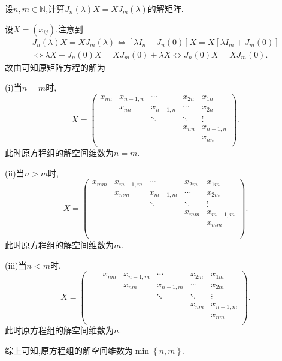 \documentclass[../../main.tex]{subfiles}
\begin{document}
\begin{corollary}\label{corollary:与Jordan块J_n(lambda)可交换的矩阵}
设$n,m\in\mathbb{N}$,计算$J_n(\lambda)X = XJ_m(\lambda)$的解矩阵. 
\end{corollary}
\begin{solution}
设$X=(x_{ij})$,注意到
\begin{gather*}
J_n\left( \lambda \right) X=XJ_m\left( \lambda \right) \Longleftrightarrow \left[ \lambda I_n+J_n\left( 0 \right) \right] X=X\left[ \lambda I_m+J_m\left( 0 \right) \right] 
\\
\Longleftrightarrow \lambda X+J_n\left( 0 \right) X=XJ_m\left( 0 \right) +\lambda X\Longleftrightarrow J_n\left( 0 \right) X=XJ_m\left( 0 \right) .
\end{gather*}
故由可知原矩阵方程的解为

(i)当$n=m$时,
\[
X=\left( \begin{matrix}
x_{nn}&		x_{n-1,n}&		\cdots&		x_{2n}&		x_{1n}\\
&		x_{nn}&		x_{n-1,n}&		\cdots&		x_{2n}\\
&		&		\ddots&		\ddots&		\vdots\\
&		&		&		x_{nn}&		x_{n-1,n}\\
&		&		&		&		x_{nn}\\
\end{matrix} \right) .
\] 
此时原方程组的解空间维数为$n=m$.

(ii)当$n>m$时,
\[
X=\left( \begin{matrix}
x_{mm}&		x_{m-1,m}&		\cdots&		x_{2m}&		x_{1m}\\
&		x_{mm}&		x_{m-1,m}&		\cdots&		x_{2m}\\
&		&		\ddots&		\ddots&		\vdots\\
&		&		&		x_{mm}&		x_{m-1,m}\\
&		&		&		&		x_{mm}\\
&		&		&		&		\\
&		&		&		&		\\
\end{matrix} \right) .
\] 
此时原方程组的解空间维数为$m$.

(iii)当$n<m$时,
\[
X=\left( \begin{matrix}
	&		&		x_{nm}&		x_{n-1,m}&		\cdots&		x_{2m}&		x_{1m}\\
	&		&		&		x_{nm}&		x_{n-1,m}&		\cdots&		x_{2m}\\
	&		&		&		&		\ddots&		\ddots&		\vdots\\
	&		&		&		&		&		x_{nm}&		x_{n-1,m}\\
	&		&		&		&		&		&		x_{nm}\\
\end{matrix} \right) .
\] 
此时原方程组的解空间维数为$n $.

综上可知,原方程组的解空间维数为$\min \left\{ n,m \right\} $.
\end{solution}
\end{document}
